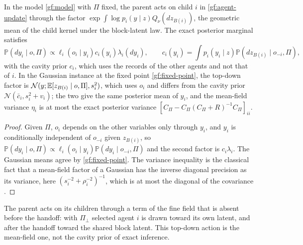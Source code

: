 In the model \cref{gf:model} with $\Pi$ fixed, the parent acts on child $i$
in \cref{gf:agent-update} through the factor
$\exp\int\log p_i(y\mid z)Q_\nu(dz_{B(i)})$, the geometric mean of the child
kernel under the block-latent law. The exact posterior marginal satisfies
\begin{equation}
 \mathbb P(dy_i\mid o,\Pi)\propto\ell_i(o_i\mid y_i)c_i(y_i)\lambda_i(dy_i),
 \qquad
 c_i(y_i)=\int p_i(y_i\mid z)\mathbb P(dz_{B(i)}\mid o_{-i},\Pi),
 \label{gf:cavity}
\end{equation}
with the cavity prior $c_i$, which uses the records of the other agents and
not that of $i$. In the Gaussian instance at the fixed point
\cref{gf:fixed-point}, the top-down factor is
$\mathcal N(y;\mathbb E[z_{B(i)}\mid o,\Pi],s_i^2)$, which uses $o_i$ and differs from
the cavity prior $\mathcal N(\bar c_i,s_i^2+v_i)$; the two give the same
posterior mean of $y_i$, and the mean-field variance $\eta_i$ is at most the
exact posterior variance $[C_\Pi-C_\Pi(C_\Pi+R)^{-1}C_\Pi]_{ii}$.
\begin{proof}
Given $\Pi$, $o_i$ depends on the other variables only through $y_i$, and
$y_i$ is conditionally independent of $o_{-i}$ given $z_{B(i)}$, so
$\mathbb P(dy_i\mid o,\Pi)\propto\ell_i(o_i\mid y_i)\mathbb P(dy_i\mid o_{-i},\Pi)$
and the second factor is $c_i\lambda_i$. The Gaussian means agree by
\cref{gf:fixed-point}. The variance inequality is the classical fact that a
mean-field factor of a Gaussian has the inverse diagonal precision as its
variance, here $(s_i^{-2}+\rho_i^{-2})^{-1}$, which is at most the diagonal of
the covariance \citep{Bishop2006}.
\end{proof}

The parent acts on its children through a term of the fine field that is
absent before the handoff: with $\Pi_\perp$ selected agent $i$ is drawn
toward its own latent, and after the handoff toward the shared block latent.
This top-down action is the mean-field one, not the cavity prior of exact
inference.

